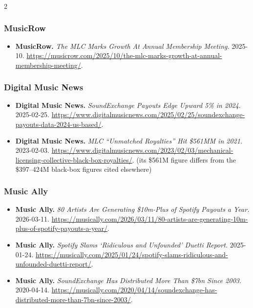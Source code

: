 {\begin{multicols}{2}
\subsubsection*{MusicRow}
\begin{itemize}[itemsep=0pt,topsep=1pt,parsep=0pt,partopsep=0pt,leftmargin=1em]
\item \textbf{MusicRow.} \textit{The MLC Marks Growth At Annual Membership Meeting.} 2025-10. \url{https://musicrow.com/2025/10/the-mlc-marks-growth-at-annual-membership-meeting/}.
\end{itemize}
\subsubsection*{Digital Music News}
\begin{itemize}[itemsep=0pt,topsep=1pt,parsep=0pt,partopsep=0pt,leftmargin=1em]
\item \textbf{Digital Music News.} \textit{SoundExchange Payouts Edge Upward 5\% in 2024.} 2025-02-25. \url{https://www.digitalmusicnews.com/2025/02/25/soundexchange-payouts-data-2024-us-based/}.
\item \textbf{Digital Music News.} \textit{MLC “Unmatched Royalties” Hit \$561MM in 2021.} 2023-02-03. \url{https://www.digitalmusicnews.com/2023/02/03/mechanical-licensing-collective-black-box-royalties/}. {\color{ammuted}(its \$561M figure differs from the \$397--424M black-box figures cited elsewhere)}
\end{itemize}
\subsubsection*{Music Ally}
\begin{itemize}[itemsep=0pt,topsep=1pt,parsep=0pt,partopsep=0pt,leftmargin=1em]
\item \textbf{Music Ally.} \textit{80 Artists Are Generating \$10m-Plus of Spotify Payouts a Year.} 2026-03-11. \url{https://musically.com/2026/03/11/80-artists-are-generating-10m-plus-of-spotify-payouts-a-year/}.
\item \textbf{Music Ally.} \textit{Spotify Slams ‘Ridiculous and Unfounded’ Duetti Report.} 2025-01-24. \url{https://musically.com/2025/01/24/spotify-slams-ridiculous-and-unfounded-duetti-report/}.
\item \textbf{Music Ally.} \textit{SoundExchange Has Distributed More Than \$7bn Since 2003.} 2020-04-14. \url{https://musically.com/2020/04/14/soundexchange-has-distributed-more-than-7bn-since-2003/}.
\end{itemize}

\end{multicols}}
